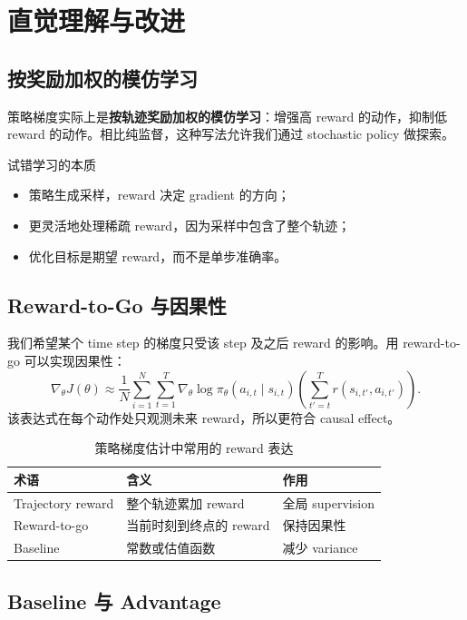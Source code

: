 \section{直觉理解与改进}

\subsection{按奖励加权的模仿学习}

策略梯度实际上是\textbf{按轨迹奖励加权的模仿学习}：增强高 reward 的动作，抑制低 reward 的动作。相比纯监督，这种写法允许我们通过 stochastic policy 做探索。

\begin{knowledgebox}{试错学习的本质}
\begin{itemize}
    \item 策略生成采样，reward 决定 gradient 的方向；
    \item 更灵活地处理稀疏 reward，因为采样中包含了整个轨迹；
    \item 优化目标是期望 reward，而不是单步准确率。
\end{itemize}
\end{knowledgebox}

\subsection{Reward-to-Go 与因果性}

我们希望某个 time step 的梯度只受该 step 及之后 reward 的影响。用 reward-to-go 可以实现因果性：
$$\nabla_\theta J(\theta) \approx \frac{1}{N}\sum_{i=1}^{N}\sum_{t=1}^{T} \nabla_\theta \log \pi_\theta(a_{i,t} \mid s_{i,t}) \left(\sum_{t'=t}^{T} r(s_{i,t'}, a_{i,t'}) \right).$$
该表达式在每个动作处只观测未来 reward，所以更符合 causal effect。

\begin{table}[H]
\centering
\small
\begin{tabular}{p{}p{}p{}}
\toprule
术语 & 含义 & 作用 \\
\midrule
Trajectory reward & 整个轨迹累加 reward & 全局 supervision \\
Reward-to-go & 当前时刻到终点的 reward & 保持因果性 \\
Baseline & 常数或估值函数 & 减少 variance \\
\bottomrule
\end{tabular}
\caption{策略梯度估计中常用的 reward 表达}
\end{table}

\subsection{Baseline 与 Advantage}

